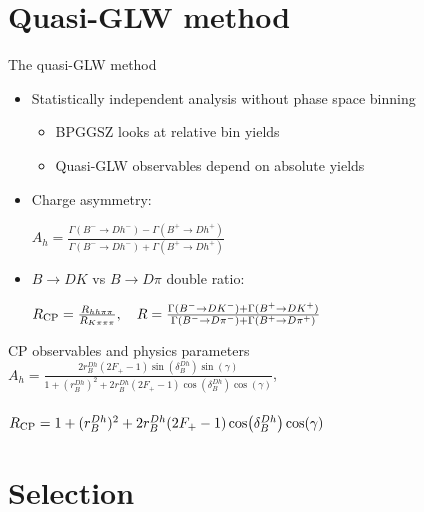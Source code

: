 \documentclass{beamer}
\begin{document}
\section{Quasi-GLW method}

\begin{frame}{The quasi-GLW method}
  \begin{itemize}
    \setlength\itemsep{0.5em}
    \item{Statistically independent analysis without phase space binning}
    \begin{itemize}
      \item{BPGGSZ looks at relative bin yields}
      \item{Quasi-GLW observables depend on absolute yields}
    \end{itemize}
    \item{Charge asymmetry:}
    \begin{center}
      $A_h = \frac{\Gamma(B^-\to D h^-) - \Gamma(B^+\to D h^+)}{\Gamma(B^-\to D h^-) + \Gamma(B^+\to D h^+)}$
    \end{center}
    \item{$B\to DK$ vs $B\to D\pi$ double ratio:}
    \begin{center}
      $R_{\rm CP} = \frac{R_{hh\pi\pi}}{R_{K\pi\pi\pi}}, \quad R = \frac{\Gamma(B^-\to D K^-) + \Gamma(B^+\to D K^+)}{\Gamma(B^-\to D\pi^-) + \Gamma(B^+\to D\pi^+)}$
    \end{center}
  \end{itemize}
  \begin{block}{CP observables and physics parameters}
    $A_h = \frac{2r_B^{Dh}(2F_+ - 1)\sin(\delta_B^{Dh})\sin(\gamma)}{1 + (r_B^{Dh})^2 + 2r_B^{Dh}(2F_+ - 1)\cos(\delta_B^{Dh})\cos(\gamma)}$, \\~\\
    $R_{\rm CP} = 1 + (r_B^{Dh})^2 + 2r_B^{Dh}(2F_+ - 1)\cos(\delta_B^{Dh})\cos(\gamma)$
  \end{block}
\end{frame}

\section{Selection}
\end{document}
